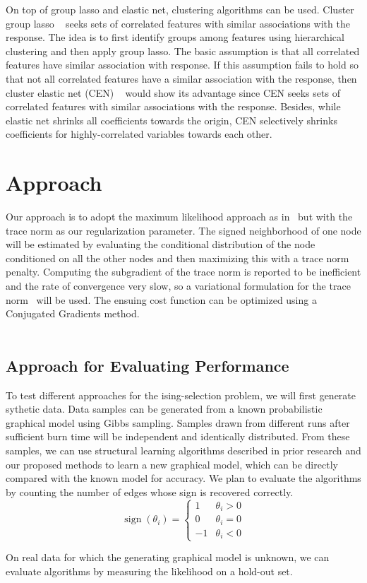 \documentclass[11pt]{article}
\begin{document}
On top of group lasso and elastic net, clustering algorithms can be used. Cluster group lasso ~\cite{Peter2013Cor} seeks sets of correlated features with similar associations with the response. The idea is to first identify groups among features using hierarchical clustering and then apply group lasso. The basic assumption is that all correlated features have similar association with response. If this assumption fails to hold so that not all correlated features have a similar association with the response, then cluster elastic net (CEN) ~\cite{Dan2014The} would show its advantage since CEN seeks sets of correlated features with similar associations with the response. Besides, while elastic net shrinks all coefficients towards the origin, CEN selectively shrinks coefficients for highly-correlated variables towards each other.

\section{Approach}
Our approach is to adopt the maximum likelihood approach as in~\cite{ravikumar2010high} but with the trace norm as our regularization parameter. The signed neighborhood of one node will be estimated by evaluating the conditional distribution of the node conditioned on all the other nodes and then maximizing this with a trace norm penalty. Computing the subgradient of the trace norm is reported to be inefficient and the rate of convergence very slow, so a variational formulation for the trace norm~\cite{grave2011trace} will be used. The ensuing cost function can be optimized using a Conjugated Gradients method. \\ \\ 
 
\subsection{Approach for Evaluating Performance}
To test different approaches for the ising-selection problem, we will first generate sythetic data. Data samples can be generated from a known probabilistic graphical model using Gibbs sampling. Samples drawn from different runs after sufficient burn time will be independent and identically distributed.  From these samples, we can use structural learning algorithms described in prior research and our proposed methods to learn a new graphical model, which can be directly compared with the known model for accuracy. We plan to evaluate the algorithms by counting the number of edges whose sign is recovered correctly.
$$\operatorname{sign}(\theta_i) = \begin{cases} 1 & \theta_i > 0\\ 0 & \theta_i = 0 \\ -1 & \theta_i < 0 \end{cases}$$

On real data for which the generating graphical model is unknown, we can evaluate algorithms by measuring the likelihood on a hold-out set.


{}

\end{document}

